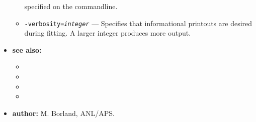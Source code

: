 \begin{itemize}
\begin{itemize}
        specified on the commandline.
    \item {\tt -verbosity={\em integer}} --- Specifies that informational printouts are desired during fitting.  A larger integer produces more output.
    \end{itemize}
\item {\bf see also:}
    \begin{itemize}
    \item {}
    \item {}
    \item {}
    \item {}
    \end{itemize}
\item {\bf author:} M. Borland, ANL/APS.
\end{itemize}



